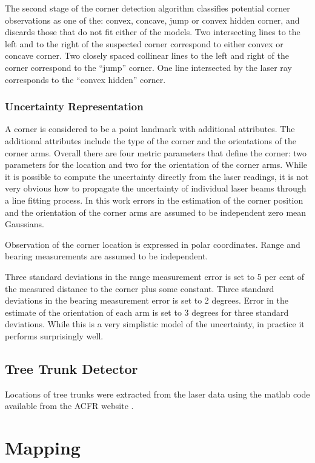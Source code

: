 The second stage of the corner detection algorithm classifies potential
corner observations as one of the: convex, concave, jump or convex
hidden corner, and discards those that do not fit either of the
models. Two intersecting lines to the left and to the right of the
suspected corner correspond to either convex or concave corner. Two
closely spaced collinear lines to the left and right of the corner
correspond to the ``jump'' corner. One line intersected by the laser
ray corresponds to the ``convex hidden'' corner.


\subsubsection{Uncertainty Representation}

A corner is considered to be a point landmark with additional
attributes. The additional attributes include the type of the corner
and the orientations of the corner arms. Overall there are four metric
parameters that define the corner: two parameters for the location and
two for the orientation of the corner arms. While it is possible to
compute the uncertainty directly from the laser readings, it is not
very obvious how to propagate the uncertainty of individual laser beams
through a line fitting process. In this work errors in the estimation
of the corner position and the orientation of the corner arms are
assumed to be independent zero mean Gaussians.

Observation of the corner location is expressed in polar coordinates.
Range and bearing measurements are assumed to be independent. 

Three standard deviations in the range measurement error is set to 5 per
cent of the measured distance to the corner plus some constant. Three
standard deviations in the bearing measurement error is set to 2
degrees.  Error in the estimate of the orientation of each arm is set to
3 degrees for three standard deviations. While this is a very simplistic
model of the uncertainty, in practice it performs surprisingly well.


\subsection{Tree Trunk Detector}

Locations of tree trunks were extracted from the laser data using the
matlab code available from the ACFR website \cite{VP_dataset}.


\section{Mapping}

